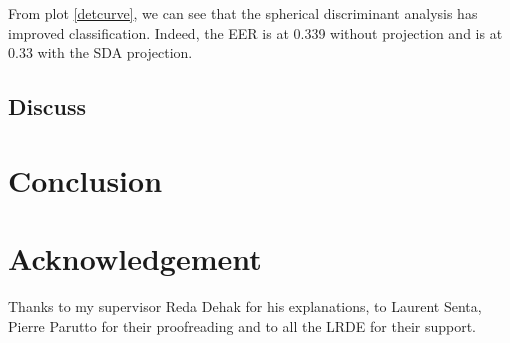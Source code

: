 \documentclass{techrep}
\begin{document}
From plot \ref{detcurve}, we can see that the spherical discriminant
analysis has improved classification. Indeed, the EER is at 0.339
without projection and is at 0.33 with the SDA projection.

\section{Discuss}

\chapter*{Conclusion}

\chapter*{Acknowledgement}

Thanks to my supervisor Reda Dehak for his explanations, to Laurent
Senta, Pierre Parutto for their proofreading and to all the LRDE for
their support.

 \nocite{*}
\end{document}
